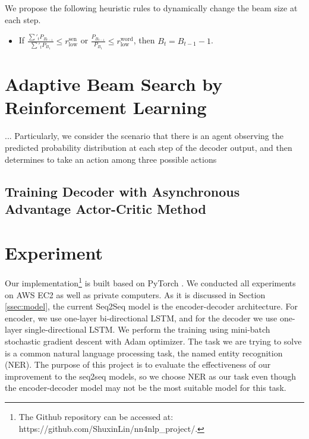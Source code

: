 \documentclass[11pt,a4paper]{article}
\begin{document}
We propose the following heuristic rules to dynamically change the beam size at each step.
\begin{itemize}
\item If $\displaystyle{\frac{\sum'_t P_{B_{t-1}}}{\sum'_t P_{B_1}}} \leq r^{\textrm{sen}}_{\textrm{low}}$ or $\displaystyle{\frac{P_{B_{t-1}}}{P_{B_1}}} \leq r^{\textrm{word}}_{\textrm{low}}$, then $B_t = B_{t-1} - 1$.
\end{itemize}






\section{Adaptive Beam Search by Reinforcement Learning}
\label{sec:RL}

... Particularly, we consider the scenario that there is an agent observing the predicted probability distribution at each step of the decoder output, and then determines to take an action among three possible actions



\subsection{Training Decoder with Asynchronous Advantage Actor-Critic Method}







\section{Experiment}

Our implementation\footnote{The Github repository can be accessed at: https://github.com/ShuxinLin/nn4nlp\_project/.} is built based on PyTorch \cite{paszke2017automatic}. We conducted all experiments on AWS EC2 as well as private computers. As it is discussed in Section \ref{ssec:model}, the current Seq2Seq model is the encoder-decoder architecture. For encoder, we use one-layer bi-directional LSTM, and for the decoder we use one-layer single-directional LSTM. We perform the training using mini-batch stochastic gradient descent with Adam optimizer. The task we are trying to solve is a common natural language processing task, the named entity recognition (NER). The purpose of this project is to evaluate the effectiveness of our improvement to the seq2seq models, so we choose NER as our task even though the encoder-decoder model may not be the most suitable model for this task.
\end{document}
